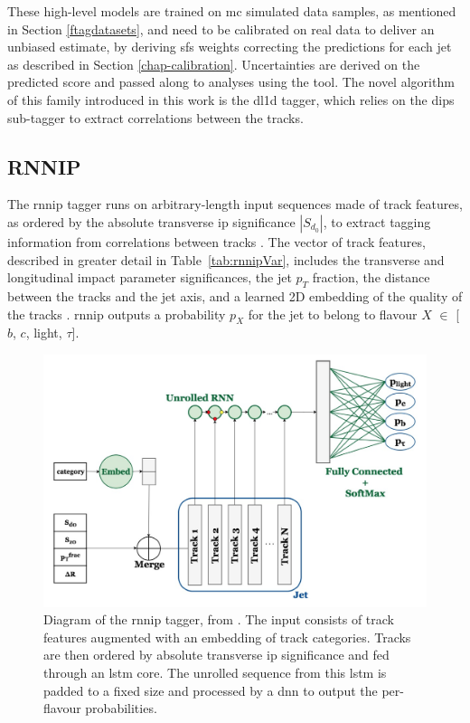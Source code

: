 These high-level models are trained on \gls{mc} simulated data samples, as mentioned in Section \ref{ftagdatasets}, and need to be calibrated on real data to deliver an unbiased estimate, by deriving \glspl{sf} weights correcting the predictions for each jet as described in Section \ref{chap-calibration}. Uncertainties are derived on the predicted score and passed along to analyses using the tool. The novel algorithm of this family introduced in this work is the \gls{dl1d} tagger, which relies on the \gls{dips} sub-tagger to extract correlations between the tracks.  

\subsection{RNNIP}
The \gls{rnnip} tagger runs on arbitrary-length input sequences made of track features, as ordered by the absolute transverse \gls{ip} significance $|S_{d_0}|$, to extract tagging information from correlations between tracks \cite{ATL-PHYS-PUB-2017-003}. The vector of track features, described in greater detail in Table~\ref{tab:rnnipVar}, includes the transverse and longitudinal impact parameter significances, the jet $p_T$ fraction, the distance between the tracks and the jet axis, and a learned 2D embedding of the quality of the tracks \cite{Paganini:2289214}. \gls{rnnip} outputs a probability $p_X$ for the jet to belong to flavour $X$ $\in$ [$b$, $c$, light, $\tau$].

\begin{figure}[h!]
  \center
  \includegraphics[scale=0.6]{Images/FTAG/rnnip_structure.png}
  \caption{Diagram of the \gls{rnnip} tagger, from \cite{Paganini:2289214}. The input consists of track features augmented with an embedding of track categories. Tracks are then ordered by absolute transverse \gls{ip} significance and fed through an \gls{lstm} core. The unrolled sequence from this \gls{lstm} is padded to a fixed size and processed by a \gls{dnn} to output the per-flavour probabilities.} 
  \label{fig:rnnipModel}
\end{figure}

